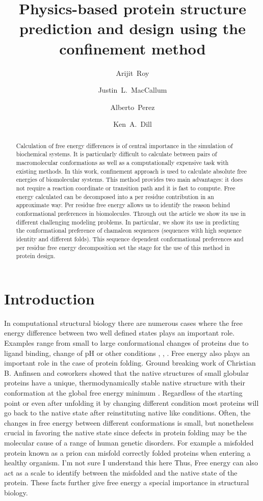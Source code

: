 \documentclass[12pt]{article}
\author{Arijit~Roy}
\author{Justin~L.~MacCallum}
\author{Alberto~Perez}
\author{Ken~A.~Dill}
\affil{Laufer Center for Physical and Quantitative Biology\\
    Stony Brook University\\
    Stony Brook, NY 11794-5252.}
\title{Physics-based protein structure prediction and design using the confinement method}
\newcommand{\Alberto}[1]{\color{ForestGreen}#1\normalcolor }
\newcommand{\Arijit}[1]{\color{yellow}#1\normalcolor}
\begin{document}
\maketitle

\begin{abstract}

Calculation of free energy differences is of central importance in the simulation of biochemical
systems. It is particularly difficult to calculate between pairs of macromolecular
conformations as well as a computationally expensive task with existing
methods. In this work, confinement approach is used to calculate absolute
free energies of biomolecular systems. This method provides two main advantages: it does not require a reaction coordinate or
transition path and it is fast to compute. Free energy calculated can be decomposed into a per
residue contribution in an 
approximate way. Per residue free energy allows us
to identify the reason behind conformational preferences in biomolecules. Through out the article we show its use in different
challenging modeling problems. In particular, we show its use in predicting the conformational
preference of chamaleon sequences (sequences with high sequence identity and different
folds). This sequence dependent conformational preferences and per residue free energy decomposition set the stage for the use of this 
method in protein design. 

\end{abstract}


\section{Introduction}

In computational structural biology there are numerous cases where the free energy difference
between two well defined 
states plays an important role. Examples range from small to large conformational changes of proteins due to
ligand binding, change of pH or other conditions \cite{Meirovitch2007}, \cite{Chipot2007}, \cite{Jorgensen2004}. 
Free energy also plays an important role in the case of protein
folding. Ground breaking work of Christian B. Anfinsen and coworkers showed that the native
structures of small globular proteins have a unique, thermodynamically stable native structure with
their conformation at the global free energy minimum \cite{Anfinsen1973}. Regardless of the starting
point or even after unfolding 
it by changing different condition most proteins will go back to the native state after
reinstituting native like conditions. Often, the changes in free energy between different
conformations is small, but nonetheless crucial in favoring the native state
 since defects in protein folding may be
the molecular cause of a range of human genetic disorders. For example a misfolded protein known as
a
prion can misfold correctly folded proteins when entering a healthy organism.
\Alberto{I'm not sure I understand this here} \Arijit{Thus, Free energy can also act as a scale to identify between the misfolded and the native state of
the protein.} These facts further give free energy a special importance in structural biology.
\end{document}

